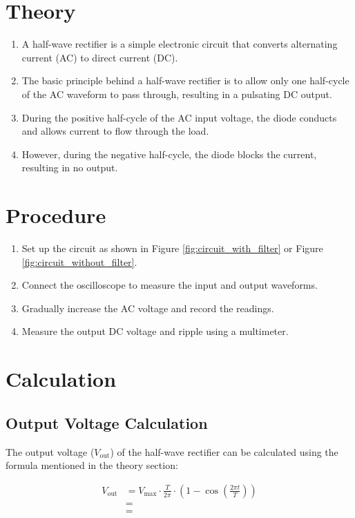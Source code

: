 \documentclass{article}
\begin{document}
\section*{Theory}
\begin{enumerate}
\item A half-wave rectifier is a simple electronic circuit that converts alternating current (AC) to direct current (DC).
\item The basic principle behind a half-wave rectifier is to allow only one half-cycle of the AC waveform to pass through, resulting in a pulsating DC output.
\item During the positive half-cycle of the AC input voltage, the diode conducts and allows current to flow through the load. 
\item However, during the negative half-cycle, the diode blocks the current, resulting in no output.
\end{enumerate}

\section*{Procedure}
\begin{enumerate}
    \item Set up the circuit as shown in Figure \ref{fig:circuit_with_filter} or Figure \ref{fig:circuit_without_filter}.
    \item Connect the oscilloscope to measure the input and output waveforms.
    \item Gradually increase the AC voltage and record the readings.
    \item Measure the output DC voltage and ripple using a multimeter.
\end{enumerate}

\section*{Calculation}

\subsection*{Output Voltage Calculation}

The output voltage (\(V_{\text{out}}\)) of the half-wave rectifier can be calculated using the formula mentioned in the theory section:

\begin{align}
V_{\text{out}} &= V_{\text{max}} \cdot \frac{T}{2\pi} \cdot \left(1 - \cos\left(\frac{2\pi t}{T}\right)\right) \nonumber\\ 
&= \nonumber \\
&=
\end{align}
\end{document}
